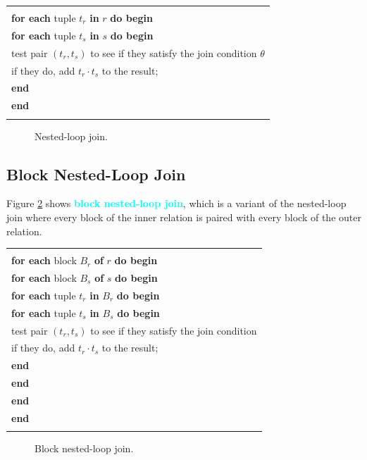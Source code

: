 \documentclass[a4paper,12pt,twoside,openany]{book}
\newcommand{\textcy}[1]{\textbf{\textcolor{cyan}{#1}}}
\begin{document}
\begin{center}
    \begin{tabular}{l}
        \hline\\
        \textbf{for each} tuple $t_r$ \textbf{in} $r$ \textbf{do begin} \\
        \qquad \textbf{for each} tuple $t_s$ \textbf{in} $s$ \textbf{do begin}\\
        \qquad\qquad test pair $(t_r,t_s)$ to see if they satisfy the join condition $\theta$\\
        \qquad\qquad if they do, add $t_r\cdot t_s$ to the result;\\
        \qquad \textbf{end}\\
        \textbf{end}\\\\
        \hline
    \end{tabular}
    \begin{figure}[htbp]
        \centering
        \caption{Nested-loop join.}
        \label{Fig:15.5}
    \end{figure}    
\end{center}

\subsection{Block Nested-Loop Join}

Figure \ref{Fig:15.6} shows \textcy{block nested-loop join}, which is a variant of the nested-loop join where every block of the inner relation is paired with every block of the outer relation.

\begin{center}
    \begin{tabular}{l}
        \hline\\
        \textbf{for each} block $B_r$ \textbf{of} $r$ \textbf{do begin}\\
        \qquad \textbf{for each} block $B_s$ \textbf{of} $s$ \textbf{do begin}\\
        \qquad\qquad \textbf{for each} tuple $t_r$ \textbf{in} $B_r$ \textbf{do begin}\\
        \qquad\qquad\qquad\textbf{for each} tuple $t_s$ \textbf{in} $B_s$ \textbf{do begin}\\
        \qquad\qquad\qquad\qquad test pair $(t_r,t_s)$ to see if they satisfy the join condition\\
        \qquad\qquad\qquad\qquad if they do, add $t_r\cdot t_s$ to the result;\\
        \qquad\qquad\qquad \textbf{end}\\
        \qquad\qquad \textbf{end}\\
        \qquad \textbf{end}\\
        \textbf{end}\\\\
        \hline
    \end{tabular}
    \begin{figure}[htbp]
        \centering
        \caption{Block nested-loop join.}
        \label{Fig:15.6}
    \end{figure}    
\end{center}
\end{document}
